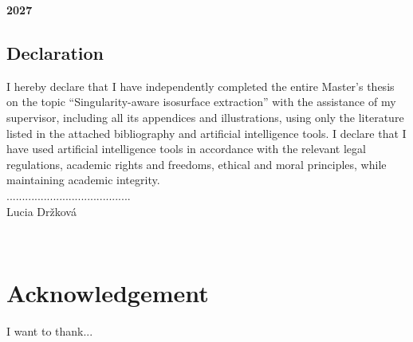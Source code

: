 \bigskip
\textbf{2027 \hfill \autor} %

\newpage



%

    
	\begin{titlepage} %
    \section*{Declaration}

		\vspace*{\fill}
		{\setlength{\parindent}{0cm} 
        I hereby declare that I have independently completed the entire Master's thesis on the topic “Singularity-aware isosurface extraction” with the assistance of my supervisor, including all its appendices and illustrations, using only the literature listed in the attached bibliography and artificial intelligence tools. I declare that I have used artificial intelligence tools in accordance with the relevant legal regulations, academic rights and freedoms, ethical and moral principles, while maintaining academic integrity.} \\
		\flushright	........................................\\
	   Lucia Držková	
	\end{titlepage}




{~}\vfill
\section*{Acknowledgement}


	I want to thank...


